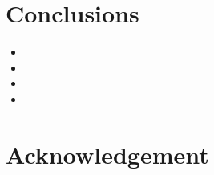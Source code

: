 \documentclass[12pt,doublespacing,a4paper]{ouparticle}
\begin{document}



\section{Conclusions}

\begin{itemize}
 \item 
 \item 
 \item 
 \item 
\end{itemize}

\section{Acknowledgement}
\end{document}
